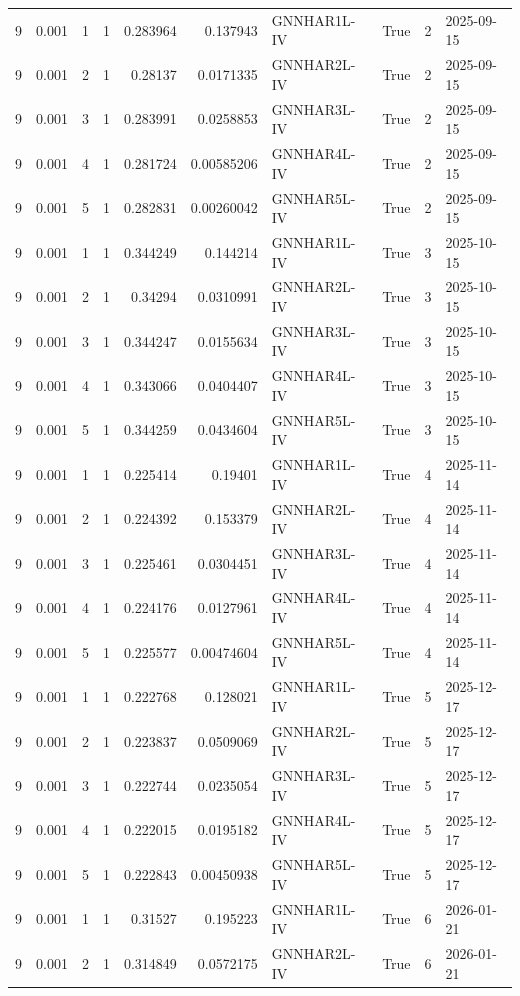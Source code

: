 \begin{tabular}{rrrrrrlrrl}
9 & 0.001 & 1 & 1 & 0.283964 & 0.137943 & GNNHAR1L-IV & True & 2 & 2025-09-15 \\
9 & 0.001 & 2 & 1 & 0.28137 & 0.0171335 & GNNHAR2L-IV & True & 2 & 2025-09-15 \\
9 & 0.001 & 3 & 1 & 0.283991 & 0.0258853 & GNNHAR3L-IV & True & 2 & 2025-09-15 \\
9 & 0.001 & 4 & 1 & 0.281724 & 0.00585206 & GNNHAR4L-IV & True & 2 & 2025-09-15 \\
9 & 0.001 & 5 & 1 & 0.282831 & 0.00260042 & GNNHAR5L-IV & True & 2 & 2025-09-15 \\
9 & 0.001 & 1 & 1 & 0.344249 & 0.144214 & GNNHAR1L-IV & True & 3 & 2025-10-15 \\
9 & 0.001 & 2 & 1 & 0.34294 & 0.0310991 & GNNHAR2L-IV & True & 3 & 2025-10-15 \\
9 & 0.001 & 3 & 1 & 0.344247 & 0.0155634 & GNNHAR3L-IV & True & 3 & 2025-10-15 \\
9 & 0.001 & 4 & 1 & 0.343066 & 0.0404407 & GNNHAR4L-IV & True & 3 & 2025-10-15 \\
9 & 0.001 & 5 & 1 & 0.344259 & 0.0434604 & GNNHAR5L-IV & True & 3 & 2025-10-15 \\
9 & 0.001 & 1 & 1 & 0.225414 & 0.19401 & GNNHAR1L-IV & True & 4 & 2025-11-14 \\
9 & 0.001 & 2 & 1 & 0.224392 & 0.153379 & GNNHAR2L-IV & True & 4 & 2025-11-14 \\
9 & 0.001 & 3 & 1 & 0.225461 & 0.0304451 & GNNHAR3L-IV & True & 4 & 2025-11-14 \\
9 & 0.001 & 4 & 1 & 0.224176 & 0.0127961 & GNNHAR4L-IV & True & 4 & 2025-11-14 \\
9 & 0.001 & 5 & 1 & 0.225577 & 0.00474604 & GNNHAR5L-IV & True & 4 & 2025-11-14 \\
9 & 0.001 & 1 & 1 & 0.222768 & 0.128021 & GNNHAR1L-IV & True & 5 & 2025-12-17 \\
9 & 0.001 & 2 & 1 & 0.223837 & 0.0509069 & GNNHAR2L-IV & True & 5 & 2025-12-17 \\
9 & 0.001 & 3 & 1 & 0.222744 & 0.0235054 & GNNHAR3L-IV & True & 5 & 2025-12-17 \\
9 & 0.001 & 4 & 1 & 0.222015 & 0.0195182 & GNNHAR4L-IV & True & 5 & 2025-12-17 \\
9 & 0.001 & 5 & 1 & 0.222843 & 0.00450938 & GNNHAR5L-IV & True & 5 & 2025-12-17 \\
9 & 0.001 & 1 & 1 & 0.31527 & 0.195223 & GNNHAR1L-IV & True & 6 & 2026-01-21 \\
9 & 0.001 & 2 & 1 & 0.314849 & 0.0572175 & GNNHAR2L-IV & True & 6 & 2026-01-21 \\

\end{tabular}
